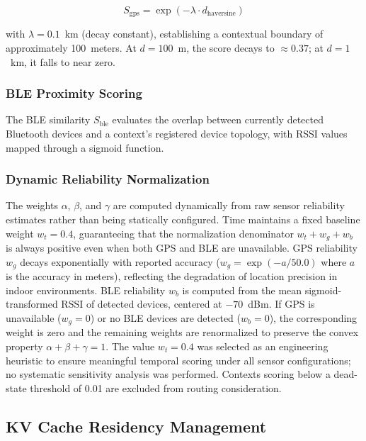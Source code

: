 \documentclass[journal]{IEEEtran}
\begin{document}
\begin{equation}
S_{\text{gps}} = \exp(-\lambda \cdot d_{\text{haversine}})
\label{eq:gps_score}
\end{equation}

\noindent with $\lambda = 0.1$~km (decay constant), establishing a contextual boundary of approximately 100~meters. At $d = 100$~m, the score decays to $\approx 0.37$; at $d = 1$~km, it falls to near zero.

\subsubsection{BLE Proximity Scoring}
The BLE similarity $S_{\text{ble}}$ evaluates the overlap between currently detected Bluetooth devices and a context's registered device topology, with RSSI values mapped through a sigmoid function.

\subsubsection{Dynamic Reliability Normalization}
\label{sec:scoring_weights}
The weights $\alpha$, $\beta$, and $\gamma$ are computed dynamically from raw sensor reliability estimates rather than being statically configured. Time maintains a fixed baseline weight $w_t = 0.4$, guaranteeing that the normalization denominator $w_t + w_g + w_b$ is always positive even when both GPS and BLE are unavailable. GPS reliability $w_g$ decays exponentially with reported accuracy ($w_g = \exp(-a / 50.0)$ where $a$ is the accuracy in meters), reflecting the degradation of location precision in indoor environments. BLE reliability $w_b$ is computed from the mean sigmoid-transformed RSSI of detected devices, centered at $-70$~dBm. If GPS is unavailable ($w_g = 0$) or no BLE devices are detected ($w_b = 0$), the corresponding weight is zero and the remaining weights are renormalized to preserve the convex property $\alpha + \beta + \gamma = 1$. The value $w_t = 0.4$ was selected as an engineering heuristic to ensure meaningful temporal scoring under all sensor configurations; no systematic sensitivity analysis was performed. Contexts scoring below a dead-state threshold of 0.01 are excluded from routing consideration.

\subsection{KV Cache Residency Management}
\label{sec:residency}
\end{document}

